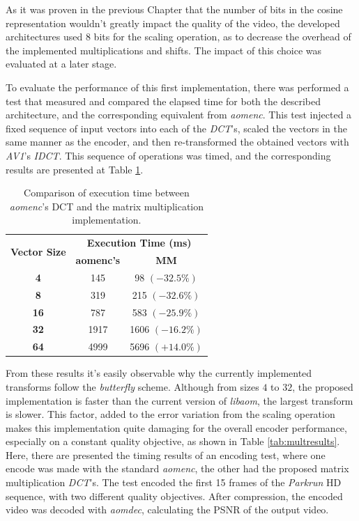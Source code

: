 As it was proven in the previous Chapter that the number of bits in the cosine representation wouldn't greatly impact the quality of the video, the developed architectures used 8 bits for the scaling operation, as to decrease the overhead of the implemented multiplications and shifts. The impact of this choice was evaluated at a later stage.

To evaluate the performance of this first implementation, there was performed a test that measured and compared the elapsed time for both the described architecture, and the corresponding equivalent from \emph{aomenc}. This test injected a fixed sequence of input vectors into each of the \emph{DCT}'s, scaled the vectors in the same manner as the encoder, and then re-transformed the obtained vectors with \emph{AV1}'s \emph{IDCT}. This sequence of operations was timed, and the corresponding results are presented at Table \ref{tab:dcttime}.

\begin{table}[!htpb]
    \centering
    \begin{tabular}{ccc} \toprule
        \multirow{2}{*}{\textbf{Vector Size}} &     \multicolumn{2}{c}{\textbf{Execution Time (ms)}} \\
         &      \textbf{aomenc's} &      \textbf{MM} \\ \toprule
        \textbf{4} &    145 &      98 $(-32.5\%)$ \\ \hline
        \textbf{8} &    319 &      215 $(-32.6\%)$ \\ \hline
        \textbf{16} &   787 &      583 $(-25.9\%)$ \\ \hline
        \textbf{32} &   1917 &     1606 $(-16.2\%)$  \\ \hline
        \textbf{64} &   4999  &    5696 $(+14.0\%)$  \\ 
        \bottomrule
    \end{tabular}
    \caption{Comparison of execution time between \emph{aomenc}'s DCT and the matrix multiplication implementation.}
    \label{tab:dcttime}
\end{table}

From these results it's easily observable why the currently implemented transforms follow the \emph{butterfly} scheme. Although from sizes $4$ to $32$, the proposed implementation is faster than the current version of \emph{libaom}, the largest transform is slower. This factor, added to the error variation from the scaling operation makes this implementation quite damaging for the overall encoder performance, especially on a constant quality objective, as shown in Table \ref{tab:multresults}. Here, there are presented the timing results of an encoding test, where one encode was made with the standard \emph{aomenc}, the other had the proposed matrix multiplication \emph{DCT}'s. The test encoded the first 15 frames of the \emph{Parkrun} HD sequence, with two different quality objectives. After compression, the encoded video was decoded with \emph{aomdec}, calculating the PSNR of the output video.

